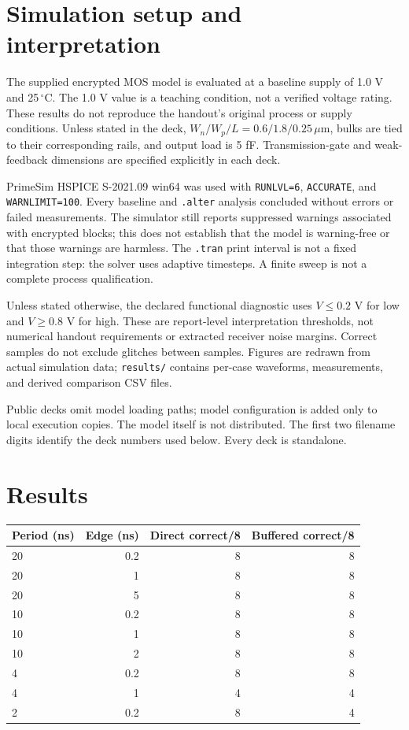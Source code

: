 \section{Simulation setup and interpretation}

The supplied encrypted MOS model is evaluated at a baseline supply of 1.0 V and 25\,$^\circ$C. The 1.0 V value is a teaching condition, not a verified voltage rating. These results do not reproduce the handout's original process or supply conditions. Unless stated in the deck, $W_n/W_p/L=0.6/1.8/0.25\,\mu\mathrm m$, bulks are tied to their corresponding rails, and output load is 5 fF. Transmission-gate and weak-feedback dimensions are specified explicitly in each deck.

PrimeSim HSPICE S-2021.09 win64 was used with \texttt{RUNLVL=6}, \texttt{ACCURATE}, and \texttt{WARNLIMIT=100}. Every baseline and \texttt{.alter} analysis concluded without errors or failed measurements. The simulator still reports suppressed warnings associated with encrypted blocks; this does not establish that the model is warning-free or that those warnings are harmless. The \texttt{.tran} print interval is not a fixed integration step: the solver uses adaptive timesteps. A finite sweep is not a complete process qualification.

Unless stated otherwise, the declared functional diagnostic uses $V\leq0.2$ V for low and $V\geq0.8$ V for high. These are report-level interpretation thresholds, not numerical handout requirements or extracted receiver noise margins. Correct samples do not exclude glitches between samples. Figures are redrawn from actual simulation data; \texttt{results/} contains per-case waveforms, measurements, and derived comparison CSV files.

Public decks omit model loading paths; model configuration is added only to local execution copies. The model itself is not distributed. The first two filename digits identify the deck numbers used below. Every deck is standalone.

\section{Results}

\begin{center}
\small
\setlength{\tabcolsep}{4pt}
\begin{tabular}{lrrr}
\toprule
Period (ns) & Edge (ns) & Direct correct/8 & Buffered correct/8 \\
\midrule
20 & 0.2 & 8 & 8 \\
20 & 1 & 8 & 8 \\
20 & 5 & 8 & 8 \\
10 & 0.2 & 8 & 8 \\
10 & 1 & 8 & 8 \\
10 & 2 & 8 & 8 \\
4 & 0.2 & 8 & 8 \\
4 & 1 & 4 & 4 \\
2 & 0.2 & 8 & 4 \\
\bottomrule
\end{tabular}
\end{center}

